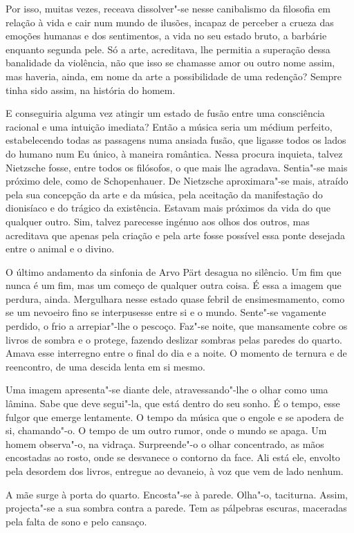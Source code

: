 Por isso, muitas vezes, receava dissolver"-se nesse canibalismo da
filosofia em relação à vida e cair num mundo de ilusões, incapaz de
perceber a crueza das emoções humanas e dos sentimentos, a vida no seu
estado bruto, a barbárie enquanto segunda pele. Só a arte, acreditava,
lhe permitia a superação dessa banalidade da violência, não que isso se
chamasse amor ou outro nome assim, mas haveria, ainda, em nome da arte a
possibilidade de uma redenção? Sempre tinha sido assim, na história do
homem.

E conseguiria alguma vez atingir um estado de fusão entre uma
consciência racional e uma intuição imediata? Então a música seria um
médium perfeito, estabelecendo todas as passagens numa ansiada fusão,
que ligasse todos os lados do humano num Eu único, à maneira romântica.
Nessa procura inquieta, talvez Nietzsche fosse, entre todos os
filósofos, o que mais lhe agradava. Sentia"-se mais próximo dele, como de
Schopenhauer. De Nietzsche aproximara"-se mais, atraído pela sua
concepção da arte e da música, pela aceitação da manifestação do
dionisíaco e do trágico da existência. Estavam mais próximos da vida do
que qualquer outro. Sim, talvez parecesse ingénuo aos olhos dos outros,
mas acreditava que apenas pela criação e pela arte fosse possível essa
ponte desejada entre o animal e o divino.

O último andamento da sinfonia de Arvo Pärt desagua no silêncio. Um fim
que nunca é um fim, mas um começo de qualquer outra coisa. É essa a
imagem que perdura, ainda. Mergulhara nesse estado quase febril de
ensimesmamento, como se um nevoeiro fino se interpusesse entre si e o
mundo. Sente"-se vagamente perdido, o frio a arrepiar"-lhe o pescoço.
Faz"-se noite, que mansamente cobre os livros de sombra e o protege,
fazendo deslizar sombras pelas paredes do quarto. Amava esse interregno
entre o final do dia e a noite. O momento de ternura e de reencontro, de
uma descida lenta em si mesmo.

Uma imagem apresenta"-se diante dele, atravessando"-lhe o olhar como uma
lâmina. Sabe que deve segui"-la, que está dentro do seu sonho. É o tempo,
esse fulgor que emerge lentamente. O tempo da música que o engole e se
apodera de si, chamando"-o. O tempo de um outro rumor, onde o mundo se
apaga. Um homem observa"-o, na vidraça. Surpreende"-o o olhar concentrado,
as mãos encostadas ao rosto, onde se desvanece o contorno da face. Ali
está ele, envolto pela desordem dos livros, entregue ao devaneio, à voz
que vem de lado nenhum.

A mãe surge à porta do quarto. Encosta"-se à parede. Olha"-o, taciturna.
Assim, projecta"-se a sua sombra contra a parede. Tem as pálpebras
escuras, maceradas pela falta de sono e pelo cansaço.


